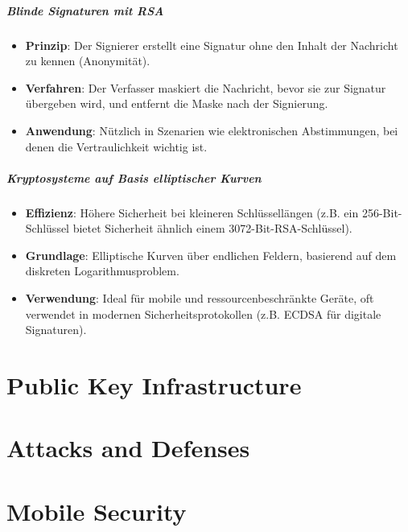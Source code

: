 \documentclass{article}
\begin{document}
\subsubsection{Blinde Signaturen mit RSA}
\begin{itemize}
  \item \textbf{Prinzip}: Der Signierer erstellt eine Signatur ohne den Inhalt der Nachricht zu kennen (Anonymität).
  \item \textbf{Verfahren}: Der Verfasser maskiert die Nachricht, bevor sie zur Signatur übergeben wird, und entfernt die Maske nach der Signierung.
  \item \textbf{Anwendung}: Nützlich in Szenarien wie elektronischen Abstimmungen, bei denen die Vertraulichkeit wichtig ist.
\end{itemize}

\subsubsection{Kryptosysteme auf Basis elliptischer Kurven}
\begin{itemize}
  \item \textbf{Effizienz}: Höhere Sicherheit bei kleineren Schlüssellängen (z.B. ein 256-Bit-Schlüssel bietet Sicherheit ähnlich einem 3072-Bit-RSA-Schlüssel).
  \item \textbf{Grundlage}: Elliptische Kurven über endlichen Feldern, basierend auf dem diskreten Logarithmusproblem.
  \item \textbf{Verwendung}: Ideal für mobile und ressourcenbeschränkte Geräte, oft verwendet in modernen Sicherheitsprotokollen (z.B. ECDSA für digitale Signaturen).
\end{itemize}



\part{Public Key Infrastructure}






\part{Attacks and Defenses}





\part{Mobile Security}

\end{document}
